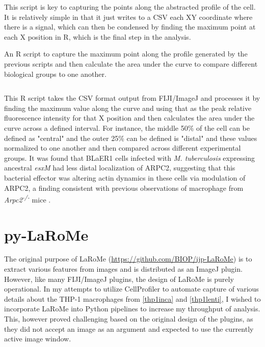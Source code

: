 This script is key to capturing the points along the abstracted profile of the cell. It is relatively simple in that it just writes to a CSV each XY coordinate where there is a signal, which can then be condensed by finding the maximum point at each X position in R, which is the final step in the analysis.

\begin{code}
\caption{An R script to capture the maximum point along the profile generated by the previous scripts and then calculate the area under the curve to compare different biological groups to one another.}
\label{blinder}

\inputminted[breaklines,frame=single,fontsize=\small]{r}{source/surface_plot_analysis.R}

\end{code}

This R script takes the CSV format output from FIJI/ImageJ and processes it by finding the maximum value along the curve and using that as the peak relative fluorescence intensity for that X position and then calculates the area under the curve across a defined interval. For instance, the middle 50\% of the cell can be defined as "central" and the outer 25\% can be defined is "distal" and these values normalized to one another and then compared across different experimental groups. It was found that BLaER1 cells infected with \textit{M. tuberculosis} expressing ancestral \textit{esxM} had less distal localization of ARPC2, suggesting that this bacterial effector was altering actin dynamics in these cells via modulation of ARPC2, a finding consistent with previous observations of macrophage from \textit{Arpc2\textsuperscript{-/-}} mice \citep{Rotty2017}.

\section{py-LaRoMe}\label{larome}

The original purpose of LaRoMe (\url{https://github.com/BIOP/ijp-LaRoMe}) is to extract various features from images and is distributed as an ImageJ plugin. However, like many FIJI/ImageJ plugins, the design of LaRoMe is purely operational. In my attempts to utilize CellProfiler \citep{Carpenter2006, Kamentsky2011, McQuin2018, Stirling2021} to automate capture of various details about the THP-1 macrophages from \autoref{thp1inca} and \autoref{thp1lenti}, I wished to incorporate LaRoMe into Python pipelines to increase my throughput of analysis. This, however proved challenging based on the original design of the plugins, as they did not accept an image as an argument and expected to use the currently active image window.

